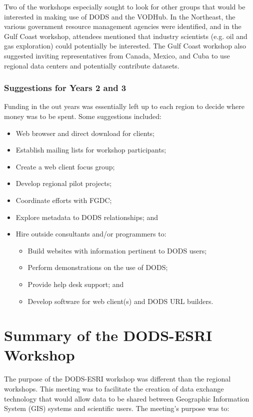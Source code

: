\documentclass{report}
\begin{document}
Two of the workshops especially sought to look for other groups that
would be interested in making use of DODS and the VODHub.  In the
Northeast, the various government resource management agencies were
identified, and in the Gulf Coast workshop, attendees mentioned that
industry scientists (e.g. oil and gas exploration) could potentially
be interested.  The Gulf Coast workshop also suggested inviting
representatives from Canada, Mexico, and Cuba to use regional data
centers and potentially contribute datasets.

\subsection{Suggestions for Years 2 and 3}

Funding in the out years was essentially left up to each region to
decide where money was to be spent.  Some suggestions included:

\begin{itemize}
\item Web browser and direct download for clients;
\item Establish mailing lists for workshop participants; 
\item Create a web client focus group; 
\item Develop regional pilot projects;
\item Coordinate efforts with FGDC;
\item Explore metadata to DODS relationships; and
\item Hire outside consultants and/or programmers to:
  \begin{itemize}
  \item Build websites with information pertinent to DODS users;
  \item Perform demonstrations on the use of DODS;
  \item Provide help desk support; and
  \item Develop software for web client(s) and DODS URL builders.
  \end{itemize}
\end{itemize}


\chapter{Summary of the DODS-ESRI Workshop}

The purpose of the DODS-ESRI workshop was different than the regional
workshops.  This meeting was to facilitate the creation of data
exchange technology that would allow data to be shared between
Geographic Information System (GIS) systems and scientific users.  The
meeting's purpose was to:
\end{document}
